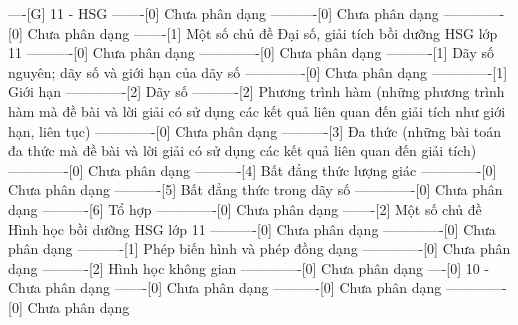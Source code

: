 ----[G] 11 - HSG
-------[0] Chưa phân dạng
----------[0] Chưa phân dạng
-------------[0] Chưa phân dạng
-------[1] Một số chủ đề Đại số, giải tích bồi dưỡng HSG lớp 11
----------[0] Chưa phân dạng
-------------[0] Chưa phân dạng
----------[1] Dãy số nguyên; dãy số và giới hạn của dãy số
-------------[0] Chưa phân dạng
-------------[1] Giới hạn
-------------[2] Dãy số
----------[2] Phương trình hàm (những phương trình hàm mà đề bài và lời giải có sử dụng các kết quả liên quan đến giải tích như giới hạn, liên tục)
-------------[0] Chưa phân dạng
----------[3] Đa thức (những bài toán đa thức mà đề bài và lời giải có sử dụng các kết quả liên quan đến giải tích)
-------------[0] Chưa phân dạng
----------[4] Bất đẳng thức lượng giác
-------------[0] Chưa phân dạng
----------[5] Bất đẳng thức trong dãy số
-------------[0] Chưa phân dạng
----------[6] Tổ hợp
-------------[0] Chưa phân dạng
-------[2] Một số chủ đề Hình học bồi dưỡng HSG lớp 11
----------[0] Chưa phân dạng
-------------[0] Chưa phân dạng
----------[1] Phép biến hình và phép đồng dạng
-------------[0] Chưa phân dạng
----------[2] Hình học không gian
-------------[0] Chưa phân dạng
----[0] 10 - Chưa phân dạng
-------[0] Chưa phân dạng
----------[0] Chưa phân dạng
-------------[0] Chưa phân dạng

